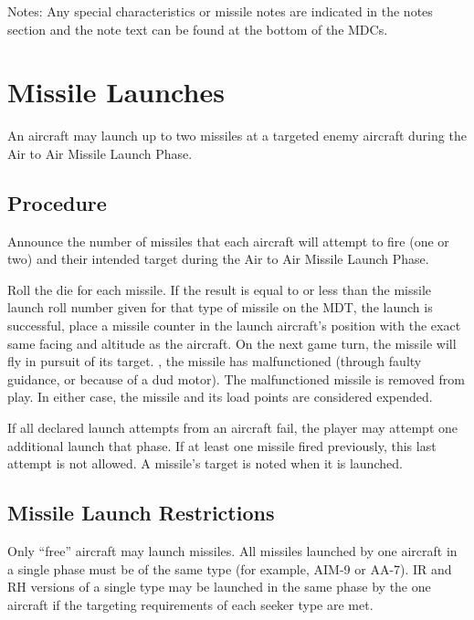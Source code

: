 Notes: Any special characteristics or missile notes are indicated in the notes section and the note text can be found at the bottom of the MDCs.

\section{Missile Launches}
\label{rule:missile-launches}

An aircraft may launch up to two missiles at a targeted enemy aircraft during the Air to Air Missile Launch Phase.


\subsection{Procedure}
Announce the number of missiles that each aircraft will attempt to fire (one or two) and their intended target during the Air to Air Missile Launch Phase.

Roll the die for each missile. If the result is equal to or less than the missile launch roll number given for that type of missile on the MDT, the launch is successful, place a missile counter in the launch aircraft's position with the exact same facing and altitude as the aircraft. On the next game turn, the missile will fly in pursuit of its target. , the missile has malfunctioned (through faulty guidance, or because of a dud motor). The malfunctioned missile is removed from play. In either case, the missile and its load points are considered expended. 

If all declared launch attempts from an aircraft fail, the player may attempt one additional launch that phase. If at least one missile fired previously, this last attempt is not allowed. A missile's target is noted when it is launched.


\subsection{Missile Launch Restrictions} Only “free” aircraft may launch missiles. All missiles launched by one aircraft in a single phase must be of the same type (for example, AIM-9 or AA-7). IR and RH versions of a single type may be launched in the same phase by the one aircraft if the targeting requirements of each seeker type are met.

